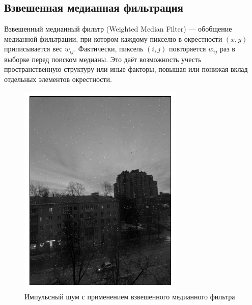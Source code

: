 \documentclass[a4paper,12pt]{article}
\begin{document}
\subsection{Взвешенная медианная фильтрация}
Взвешенный медианный фильтр (Weighted Median Filter) --- обобщение медианной фильтрации, при котором каждому пикселю в окрестности \((x,y)\) приписывается вес \(w_{ij}\). Фактически, пиксель \((i,j)\) повторяется \(w_{ij}\) раз в выборке перед поиском медианы. Это даёт возможность учесть пространственную структуру или иные факторы, повышая или понижая вклад отдельных элементов окрестности.
\begin{figure}[H]
    \begin{minipage}{0.49\textwidth}
        \centering \includegraphics[width=\textwidth]{results/nlf_sap_2.png}
        \caption{Импульсный шум с применением взвешенного медианного фильтра}
    \end{minipage}\hfill
    \begin{minipage}{0.49\textwidth}

\end{minipage}
\end{figure}
\end{document}
